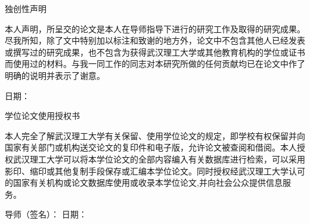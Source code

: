 \begin{titlepage}

\begin{adjustwidth}{6mm}{6mm}

\makebox[30mm]{\vspace{20mm}}

\begin{center}
\heiti 独创性声明
\end{center}
\vspace{5mm}
\begin{spacing}{1.4}
\par {\STZhongsong  本人声明，所呈交的论文是本人在导师指导下进行的研究工作及取得的研究成果。尽我所知，除了文中特别加以标注和致谢的地方外，论文中不包含其他人已经发表或撰写过的研究成果，也不包含为获得武汉理工大学或其他教育机构的学位或证书而使用过的材料。与我一同工作的同志对本研究所做的任何贡献均已在论文中作了明确的说明并表示了谢意。}
\end{spacing}
\vspace{3mm}
 \CJKunderline{\makebox[30mm]{}} \hspace{8mm} {\STZhongsong 日\hspace{3mm}期：} \CJKunderline{\makebox[30mm]{}}


\vspace{40mm}




\begin{center}
\heiti 学位论文使用授权书
\end{center}
\vspace{3mm}
\begin{spacing}{1.4}
\par {\STZhongsong 本人完全了解武汉理工大学有关保留、使用学位论文的规定，即学校有权保留并向国家有关部门或机构送交论文的复印件和电子版，允许论文被查阅和借阅。本人授权武汉理工大学可以将本学位论文的全部内容编入有关数据库进行检索，可以采用影印、缩印或其他复制手段保存或汇编本学位论文。同时授权经武汉理工大学认可的国家有关机构或论文数据库使用或收录本学位论文,并向社会公众提供信息服务。}
\end{spacing}
\vspace{3mm}

\vspace{20mm}
 \hspace{20mm} {\STZhongsong 导师（签名）：} \hspace{20mm} {\STZhongsong 日期：}


\end{adjustwidth}
\end{titlepage}



